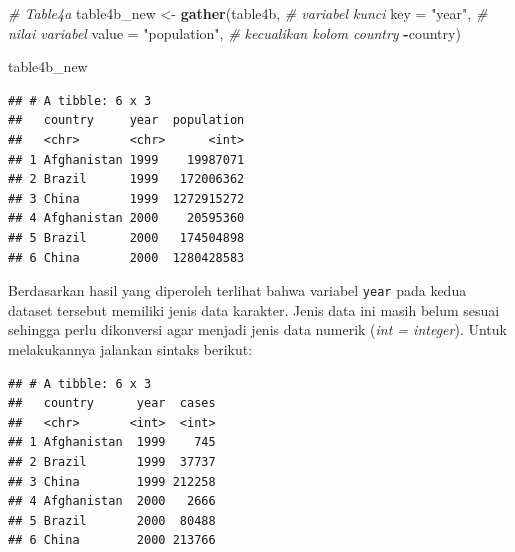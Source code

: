 \documentclass[]{book}
\newenvironment{Shaded}{\begin{snugshade}}{\end{snugshade}}
\newcommand{\KeywordTok}[1]{\textcolor[rgb]{0.13,0.29,0.53}{\textbf{#1}}}
\newcommand{\DataTypeTok}[1]{\textcolor[rgb]{0.13,0.29,0.53}{#1}}
\newcommand{\StringTok}[1]{\textcolor[rgb]{0.31,0.60,0.02}{#1}}
\newcommand{\CommentTok}[1]{\textcolor[rgb]{0.56,0.35,0.01}{\textit{#1}}}
\newcommand{\OperatorTok}[1]{\textcolor[rgb]{0.81,0.36,0.00}{\textbf{#1}}}
\newcommand{\NormalTok}[1]{#1}
\begin{document}
\begin{Shaded}
\begin{Highlighting}[]
\CommentTok{# Table4a}
\NormalTok{table4b_new <-}\StringTok{ }\KeywordTok{gather}\NormalTok{(table4b, }
                    \CommentTok{# variabel kunci}
                    \DataTypeTok{key =} \StringTok{"year"}\NormalTok{,}
                    \CommentTok{# nilai variabel}
                    \DataTypeTok{value =} \StringTok{"population"}\NormalTok{,}
                    \CommentTok{# kecualikan kolom country}
                    \OperatorTok{-}\NormalTok{country)}

\NormalTok{table4b_new}
\end{Highlighting}
\end{Shaded}

\begin{verbatim}
## # A tibble: 6 x 3
##   country     year  population
##   <chr>       <chr>      <int>
## 1 Afghanistan 1999    19987071
## 2 Brazil      1999   172006362
## 3 China       1999  1272915272
## 4 Afghanistan 2000    20595360
## 5 Brazil      2000   174504898
## 6 China       2000  1280428583
\end{verbatim}

Berdasarkan hasil yang diperoleh terlihat bahwa variabel \texttt{year}
pada kedua dataset tersebut memiliki jenis data karakter. Jenis data ini
masih belum sesuai sehingga perlu dikonversi agar menjadi jenis data
numerik (\emph{int = integer}). Untuk melakukannya jalankan sintaks
berikut:

\begin{Shaded}
\end{Shaded}

\begin{verbatim}
## # A tibble: 6 x 3
##   country      year  cases
##   <chr>       <int>  <int>
## 1 Afghanistan  1999    745
## 2 Brazil       1999  37737
## 3 China        1999 212258
## 4 Afghanistan  2000   2666
## 5 Brazil       2000  80488
## 6 China        2000 213766
\end{verbatim}

\begin{Shaded}
\end{Shaded}
\end{document}
